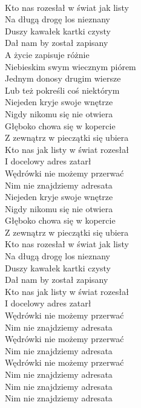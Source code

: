\begin{text}
\vin\\
Kto nas rozesłał w świat jak listy\\
Na długą drogę los nieznany\\
Duszy kawałek kartki czysty\\
Dał nam by został zapisany\\

A życie zapisuje różnie\\
Niebieskim swym wiecznym piórem\\
Jednym donosy drugim wiersze\\
Lub też pokreśli coś niektórym\\

\vin Niejeden kryje swoje wnętrze\\
\vin Nigdy nikomu się nie otwiera\\
\vin Głęboko chowa się w kopercie\\
\vin Z zewnątrz w pieczątki się ubiera\\

Kto nas jak listy w świat rozesłał\\
I docelowy adres zatarł\\
Wędrówki nie możemy przerwać\\
Nim nie znajdziemy adresata\\

\vin Niejeden kryje swoje wnętrze\\
\vin Nigdy nikomu się nie otwiera\\
\vin Głęboko chowa się w kopercie\\
\vin Z zewnątrz w pieczątki się ubiera\\

Kto nas rozesłał w świat jak listy\\
Na długą drogę los nieznany\\
Duszy kawałek kartki czysty\\
Dał nam by został zapisany\\

\vin Kto nas jak listy w świat rozesłał\\
\vin I docelowy adres zatarł\\
\vin Wędrówki nie możemy przerwać\\
\vin Nim nie znajdziemy adresata\\

Wędrówki nie możemy przerwać\\
Nim nie znajdziemy adresata\\
Wędrówki nie możemy przerwać\\
Nim nie znajdziemy adresata\\
Nim nie znajdziemy adresata\\
Nim nie znajdziemy adresata\\
\end{text}
